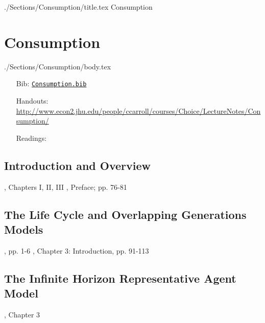 \documentclass{econtex}
\begin{document}
\begin{verbatimwrite}{./Sections/Consumption/title.tex}
Consumption
\end{verbatimwrite}

\section{Consumption}\label{sec:consumption}
\begin{verbatimwrite}{./Sections/Consumption/body.tex}

\begin{itemize}
\item[Bib:] \texttt{\href{http://www.econ2.jhu.edu/people/ccarroll/courses/Choice/Syllabus/Consumption.bib}{Consumption.bib}}
\item[Handouts:] \url{http://www.econ2.jhu.edu/people/ccarroll/courses/Choice/LectureNotes/Consumption/}
\item[Readings:]
\end{itemize}

\newcommand{\IntroC}{Introduction and Overview}
\subsection{\IntroC}\label{subsec:\IntroC}

\newcommand{\dt}{\cite{deatonUnderstandingC}}
\newcommand{\fr}{\cite{friedmanATheory}}
\bi
\reqd \fr, Chapters I, II, III
\reqd \dt, Preface; pp. 76-81
\ei

\subsection{The Life Cycle and Overlapping Generations Models}

\providecommand{\blf}{\cite{blanchard&fischer:text}}
\providecommand{\ro}{\cite{romer:text}}
\bi
\reqd \dt, pp. 1-6
\reqd \blf, Chapter 3: Introduction, pp. 91-113
\recm \cite{diamond:olg}
\recm \cite{feldstein:induced}
\reqd \cite{modigliani:nobel}
\recm \cite{summersCapTax}
\recm \cite{pemberton:failure}
\reqd \cite{carroll&summers:cparallelsy}
\ei

\subsection{The Infinite Horizon Representative Agent Model}

\bi
\reqd \dt, Chapter 3
\reqd \cite{hallRandomWalk}
\recm \cite{flavinSensitive}
\recm \cite{cdSmooth}
\reqd \cite{cmModel}
\recm \cite{hallSubstitution}
\recm \cite{cfwSentiment}
\ei


\end{verbatimwrite}
\end{document}
